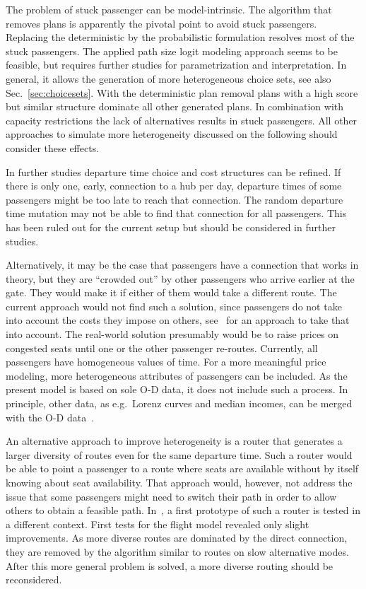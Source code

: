 The problem of stuck passenger can be model-intrinsic. 
The algorithm that removes plans is apparently the pivotal point to avoid stuck passengers. 
Replacing the deterministic by the probabilistic formulation resolves most of the stuck passengers. 
The applied path size logit modeling approach seems to be feasible, but requires further studies for parametrization and interpretation. 
In general, it allows the generation of more heterogeneous choice sets, see also Sec.~\ref{sec:choicesets}. 
With the deterministic plan removal plans with a high score but similar structure dominate all other generated plans. 
In combination with capacity restrictions the lack of alternatives results in stuck passengers.  
All other approaches to simulate more heterogeneity discussed on the following should consider these effects.  

In further studies departure time choice and cost structures can be refined. 
If there is only one, early, connection to a hub per day, departure times of some passengers might be too late to reach that connection. 
The random departure time mutation may not be able to find that connection for all passengers. 
This has been ruled out for the current setup but should be considered in further studies. 

Alternatively, it may be the case that passengers have a connection that works in theory, but they are ``crowded out'' by other passengers who arrive earlier at the gate.  
They would make it if either of them would take a different route.  
The current approach would not find such a solution, since passengers do not take into account the costs they impose on others, see~\citet{LaemmelFloetteroed2009KISysOptEvac} for an approach to take that into account.  
The real-world solution presumably would be to raise prices on congested seats until one or the other passenger re-routes. 
Currently, all passengers have homogeneous values of time.   
For a more meaningful price modeling, more heterogeneous attributes of passengers can be included. 
As the present model is based on sole O-D data, it does not include such a process. 
In principle, other data, as e.g.~Lorenz curves and median incomes, can be merged with the O-D data~\citep{KickhoeferEtAl2011PolicyEvaluationIncome}.  

An alternative approach to improve heterogeneity is a router that generates a larger diversity of routes even for the same departure time.  
Such a router would be able to point a passenger to a route where seats are available without by itself knowing about seat availability.  
That approach would, however, not address the issue that some passengers might need to switch their path in order to allow others to obtain a feasible path. 
In~\citet{Graf2013Da}, a first prototype of such a router is tested in a different context. 
First tests for the flight model revealed only slight improvements. 
As more diverse routes are dominated by the direct connection, they are removed by the algorithm similar to routes on slow alternative modes. 
After this more general problem is solved, a more diverse routing should be reconsidered. 

